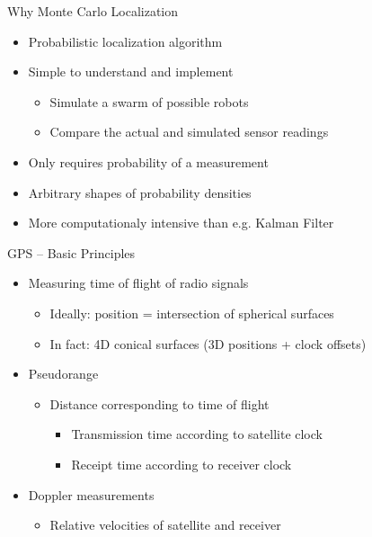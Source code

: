\documentclass[utf8]{beamer}
\begin{document}
\begin{frame}{Why Monte Carlo Localization}
    \begin{itemize}
        \item Probabilistic localization algorithm
        \item Simple to understand and implement
        \begin{itemize}
            \item Simulate a swarm of possible robots
            \item Compare the actual and simulated sensor readings
        \end{itemize}
        \item Only requires probability of a measurement
        \item Arbitrary shapes of probability densities
    \end{itemize}

    \begin{itemize}
        \item More computationaly intensive than e.g. Kalman Filter
    \end{itemize}
\end{frame}

\begin{frame}{GPS -- Basic Principles}
    \begin{itemize}
        \item Measuring time of flight of radio signals
        \begin{itemize}
            \item Ideally: position = intersection of spherical surfaces
            \item In fact: 4D conical surfaces (3D positions + clock offsets)
        \end{itemize}
        \item Pseudorange
        \begin{itemize}
            \item Distance corresponding to time of flight
            \begin{itemize}
                \item Transmission time according to satellite clock
                \item Receipt time according to receiver clock
            \end{itemize}
        \end{itemize}
        \item Doppler measurements
        \begin{itemize}
            \item Relative velocities of satellite and receiver
        \end{itemize}
    \end{itemize}
\end{frame}
\end{document}
